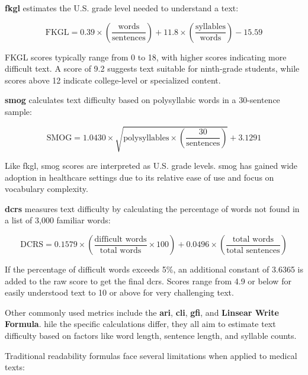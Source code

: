 \textbf{\gls{fkgl}} estimates the U.S. grade level needed to understand a text:

\begin{equation}
    \text{FKGL} = 0.39 \times \left(\frac{\text{words}}{\text{sentences}}\right) + 11.8 \times \left(\frac{\text{syllables}}{\text{words}}\right) - 15.59
\end{equation}

FKGL scores typically range from 0 to 18, with higher scores indicating more difficult text. A score of 9.2 suggests text suitable for ninth-grade students, while scores above 12 indicate college-level or specialized content.

\textbf{\gls{smog}} calculates text difficulty based on polysyllabic words in a 30-sentence sample:

\begin{equation}
    \text{SMOG} = 1.0430 \times \sqrt{\text{polysyllables} \times \left(\frac{30}{\text{sentences}}\right)} + 3.1291
\end{equation}

Like \gls{fkgl}, \gls{smog} scores are interpreted as U.S. grade levels. 
\gls{smog} has gained wide adoption in healthcare settings due to its relative ease of use and focus on vocabulary complexity.

\textbf{\gls{dcrs}} measures text difficulty by calculating the percentage of words not found in a list of 3,000 familiar words:

\begin{equation}
    \text{DCRS} = 0.1579 \times \left(\frac{\text{difficult words}}{\text{total words}} \times 100\right) + 0.0496 \times \left(\frac{\text{total words}}{\text{total sentences}}\right)
\end{equation}

If the percentage of difficult words exceeds 5\%, an additional constant of 3.6365 is added to the raw score to get the final \gls{dcrs}. Scores range from 4.9 or below for easily understood text to 10 or above for very challenging text.

Other commonly used metrics include the \textbf{\gls{ari}}, \textbf{\gls{cli}}, \textbf{\gls{gfi}}, and \textbf{Linsear Write Formula}. 
hile the specific calculations differ, they all aim to estimate text difficulty based on factors like word length, sentence length, and syllable counts.

Traditional readability formulas face several limitations when applied to medical texts:

